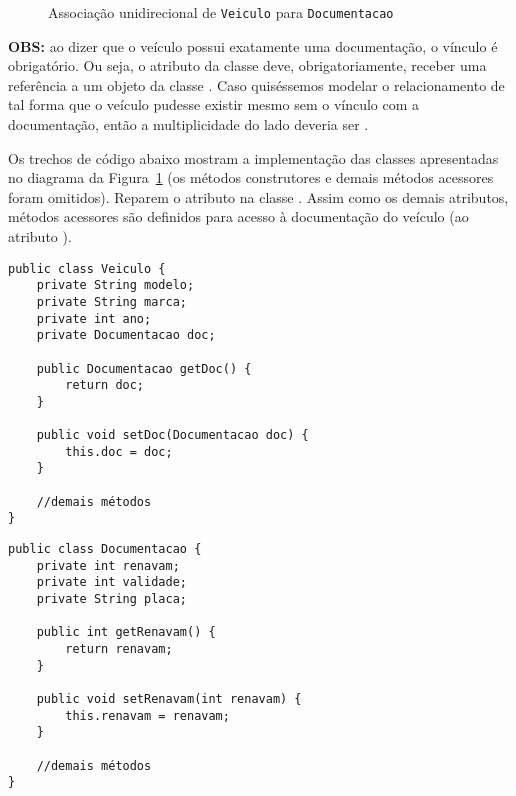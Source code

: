 \begin{figure}[h]
	\centering
	
	
	\caption{Associação unidirecional de \texttt{Veiculo} para \texttt{Documentacao}}
	\label{fig:associacao-uni-veiculo}
\end{figure}

\textbf{OBS:} ao dizer que o veículo possui exatamente uma documentação, o vínculo é obrigatório. Ou seja, o atributo  da classe  deve, obrigatoriamente, receber uma referência a um objeto da classe . Caso quiséssemos modelar o relacionamento de tal forma que o veículo pudesse existir mesmo sem o vínculo com a documentação, então a multiplicidade do lado  deveria ser .

Os trechos de código abaixo mostram a implementação das classes apresentadas no diagrama da Figura~\ref{fig:associacao-uni-veiculo} (os métodos construtores e demais métodos acessores foram omitidos). Reparem o atributo  na classe . Assim como os demais atributos, métodos acessores são definidos para acesso à documentação do veículo (ao atributo ).
 
\begin{verbatim}
public class Veiculo { 
	private String modelo; 
	private String marca; 
	private int ano; 
	private Documentacao doc; 

	public Documentacao getDoc() {
		return doc;
	}
	 
	public void setDoc(Documentacao doc) {
		this.doc = doc;
	}
	
	//demais métodos
}
\end{verbatim}

\begin{verbatim}
public class Documentacao { 
	private int renavam; 
	private int validade;
	private String placa; 
	
	public int getRenavam() {
		return renavam;
	}
	 
	public void setRenavam(int renavam) {
		this.renavam = renavam;
	}
	
	//demais métodos
}
\end{verbatim}

